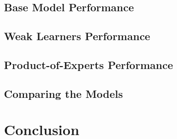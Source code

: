 \documentclass[11pt,a4paper]{article}
\begin{document}
\subsection{Base Model Performance}
\subsection{Weak Learners Performance}
\subsection{Product-of-Experts Performance}
\subsection{Comparing the Models}

\section{Conclusion}






\appendix
\end{document}
